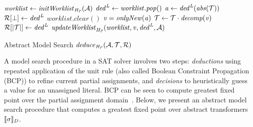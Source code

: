 \begin{algorithm2e}[t]
\DontPrintSemicolon
{}
\begin{small}
$\mathit{worklist} \leftarrow \mathit{initWorklist}_{\mathit{H_P}}(\mathcal{A})$ \;
{
  $\mathit{ded}^{\mathit{L}} \leftarrow \mathit{worklist.pop}()$ \; 
  $\mathit{a} \leftarrow \mathit{ded}^{\mathit{L}}(\mathit{abs}(\mathcal{T}))$\;
  \uIf{$\absval = \bot$} {
    $\mathcal{R}[\bot] \leftarrow \mathit{ded}^{\mathit{L}}$ \;
    $\mathit{worklist.clear}()$ \;
    \return \conflict \;
  }
  \uElse
  {
    $\mathit{v}=\mathit{onlyNew}(\mathit{a})$\;
    $\mathcal{T} \leftarrow \mathcal{T} \cdot {\mathit{decomp}}(\mathit{v})$ \; 
    $\mathcal{R}[|\mathcal{T}|] \leftarrow \mathit{ded}^{\mathit{L}}$ \;
    $\mathit{updateWorklist}_{\mathit{H_P}}(\mathit{worklist}, \mathit{v}, \mathit{ded}^{\mathit{L}},  \mathcal{A})$ \; 
  }
}
 {
  \return \sat
}
 \return \unknown \;

\end{small}
\caption{Abstract Model Search $\mathit{deduce}_{\mathit{H_P}}(\mathcal{A},\mathcal{T},\mathcal{R})$ \label{Alg:ms}}
\end{algorithm2e}
%  
A model search procedure in a SAT solver involves two steps: {\em deductions} 
using repeated application of the unit rule (also called Boolean Constraint Propagation (BCP)) 
to refine current partial assignments, and {\em decisions} to heuristically guess a value for 
an unassigned literal. BCP can be seen to compute greatest fixed point over the partial assignment  domain~\cite{dhk2013-popl}.  Below, we present an abstract model search procedure that computes a greatest fixed point over abstract transformers $\llbracket \sigma \rrbracket_{\mathit{D}}$.
 
%

